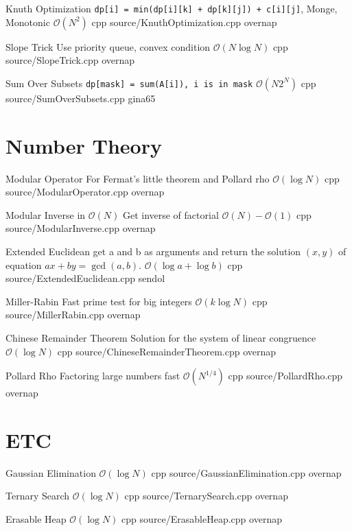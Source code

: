 \documentclass[landscape, 10pt, a4paper, oneside, twocolumn]{extarticle}
\begin{document}
\Algorithm
{Knuth Optimization}
{\texttt{dp[i] = min(dp[i][k] + dp[k][j]) + c[i][j]}, Monge, Monotonic}
{$\mathcal{O}(N^2)$}
{cpp}
{source/KnuthOptimization.cpp}
{overnap}

\Algorithm
{Slope Trick}
{Use priority queue, convex condition}
{$\mathcal{O}(N\log{N})$}
{cpp}
{source/SlopeTrick.cpp}
{overnap}

\Algorithm
{Sum Over Subsets}
{\texttt{dp[mask] = sum(A[i]), i is in mask}}
{$\mathcal{O}(N2^N)$}
{cpp}
{source/SumOverSubsets.cpp}
{gina65}

\section{Number Theory}

\Algorithm
{Modular Operator}
{For Fermat's little theorem and Pollard rho}
{$\mathcal{O}(\log{N})$}
{cpp}
{source/ModularOperator.cpp}
{overnap}

\Algorithm
{Modular Inverse in $\mathcal{O}(N)$}
{Get inverse of factorial}
{$\mathcal{O}(N)-\mathcal{O}(1)$}
{cpp}
{source/ModularInverse.cpp}
{overnap}

\Algorithm
{Extended Euclidean}
{get a and b as arguments and return the solution $(x, y)$ of equation $ax + by = \gcd(a, b)$.}
{$\mathcal{O}(\log{a} + \log{b})$}
{cpp}
{source/ExtendedEuclidean.cpp}
{sendol}

\Algorithm
{Miller-Rabin}
{Fast prime test for big integers}
{$\mathcal{O}(k\log{N})$}
{cpp}
{source/MillerRabin.cpp}
{overnap}

\Algorithm
{Chinese Remainder Theorem}
{Solution for the system of linear congruence}
{$\mathcal{O}(\log{N})$}
{cpp}
{source/ChineseRemainderTheorem.cpp}
{overnap}

\Algorithm
{Pollard Rho}
{Factoring large numbers fast}
{$\mathcal{O}(N^{1/4})$}
{cpp}
{source/PollardRho.cpp}
{overnap}


\section{ETC}

\Algorithm
{Gaussian Elimination}
{}
{$\mathcal{O}(\log{N})$}
{cpp}
{source/GaussianElimination.cpp}
{overnap}

\Algorithm
{Ternary Search}
{}
{$\mathcal{O}(\log{N})$}
{cpp}
{source/TernarySearch.cpp}
{overnap}

\Algorithm
{Erasable Heap}
{}
{$\mathcal{O}(\log{N})$}
{cpp}
{source/ErasableHeap.cpp}
{overnap}
\end{document}
